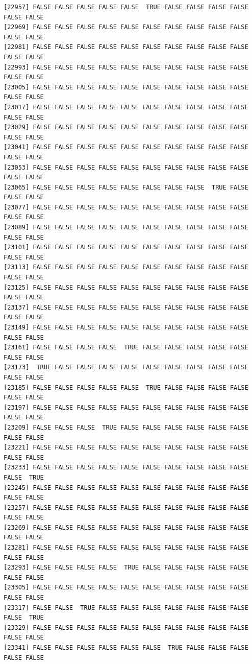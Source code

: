 \documentclass[
  a4paper,
  DIV=11,
  numbers=noendperiod]{scrartcl}
\begin{document}
\begin{verbatim}
[22957] FALSE FALSE FALSE FALSE FALSE  TRUE FALSE FALSE FALSE FALSE FALSE FALSE
[22969] FALSE FALSE FALSE FALSE FALSE FALSE FALSE FALSE FALSE FALSE FALSE FALSE
[22981] FALSE FALSE FALSE FALSE FALSE FALSE FALSE FALSE FALSE FALSE FALSE FALSE
[22993] FALSE FALSE FALSE FALSE FALSE FALSE FALSE FALSE FALSE FALSE FALSE FALSE
[23005] FALSE FALSE FALSE FALSE FALSE FALSE FALSE FALSE FALSE FALSE FALSE FALSE
[23017] FALSE FALSE FALSE FALSE FALSE FALSE FALSE FALSE FALSE FALSE FALSE FALSE
[23029] FALSE FALSE FALSE FALSE FALSE FALSE FALSE FALSE FALSE FALSE FALSE FALSE
[23041] FALSE FALSE FALSE FALSE FALSE FALSE FALSE FALSE FALSE FALSE FALSE FALSE
[23053] FALSE FALSE FALSE FALSE FALSE FALSE FALSE FALSE FALSE FALSE FALSE FALSE
[23065] FALSE FALSE FALSE FALSE FALSE FALSE FALSE FALSE  TRUE FALSE FALSE FALSE
[23077] FALSE FALSE FALSE FALSE FALSE FALSE FALSE FALSE FALSE FALSE FALSE FALSE
[23089] FALSE FALSE FALSE FALSE FALSE FALSE FALSE FALSE FALSE FALSE FALSE FALSE
[23101] FALSE FALSE FALSE FALSE FALSE FALSE FALSE FALSE FALSE FALSE FALSE FALSE
[23113] FALSE FALSE FALSE FALSE FALSE FALSE FALSE FALSE FALSE FALSE FALSE FALSE
[23125] FALSE FALSE FALSE FALSE FALSE FALSE FALSE FALSE FALSE FALSE FALSE FALSE
[23137] FALSE FALSE FALSE FALSE FALSE FALSE FALSE FALSE FALSE FALSE FALSE FALSE
[23149] FALSE FALSE FALSE FALSE FALSE FALSE FALSE FALSE FALSE FALSE FALSE FALSE
[23161] FALSE FALSE FALSE FALSE  TRUE FALSE FALSE FALSE FALSE FALSE FALSE FALSE
[23173]  TRUE FALSE FALSE FALSE FALSE FALSE FALSE FALSE FALSE FALSE FALSE FALSE
[23185] FALSE FALSE FALSE FALSE FALSE  TRUE FALSE FALSE FALSE FALSE FALSE FALSE
[23197] FALSE FALSE FALSE FALSE FALSE FALSE FALSE FALSE FALSE FALSE FALSE FALSE
[23209] FALSE FALSE FALSE  TRUE FALSE FALSE FALSE FALSE FALSE FALSE FALSE FALSE
[23221] FALSE FALSE FALSE FALSE FALSE FALSE FALSE FALSE FALSE FALSE FALSE FALSE
[23233] FALSE FALSE FALSE FALSE FALSE FALSE FALSE FALSE FALSE FALSE FALSE  TRUE
[23245] FALSE FALSE FALSE FALSE FALSE FALSE FALSE FALSE FALSE FALSE FALSE FALSE
[23257] FALSE FALSE FALSE FALSE FALSE FALSE FALSE FALSE FALSE FALSE FALSE FALSE
[23269] FALSE FALSE FALSE FALSE FALSE FALSE FALSE FALSE FALSE FALSE FALSE FALSE
[23281] FALSE FALSE FALSE FALSE FALSE FALSE FALSE FALSE FALSE FALSE FALSE FALSE
[23293] FALSE FALSE FALSE FALSE  TRUE FALSE FALSE FALSE FALSE FALSE FALSE FALSE
[23305] FALSE FALSE FALSE FALSE FALSE FALSE FALSE FALSE FALSE FALSE FALSE FALSE
[23317] FALSE FALSE  TRUE FALSE FALSE FALSE FALSE FALSE FALSE FALSE FALSE  TRUE
[23329] FALSE FALSE FALSE FALSE FALSE FALSE FALSE FALSE FALSE FALSE FALSE FALSE
[23341] FALSE FALSE FALSE FALSE FALSE FALSE  TRUE FALSE FALSE FALSE FALSE FALSE

\end{verbatim}
\end{document}

